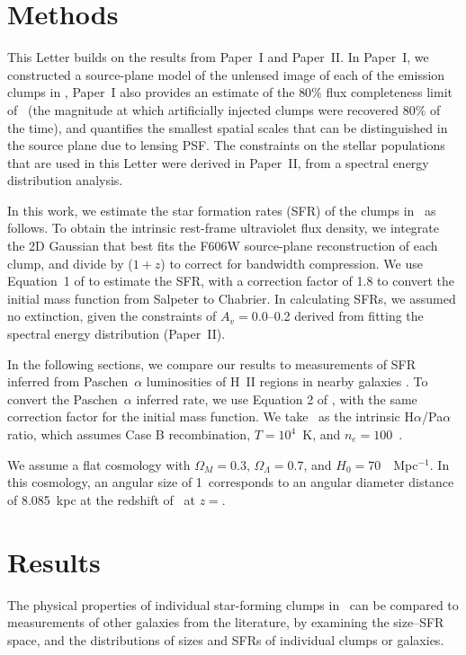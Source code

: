 \section{Methods}\label{sec:methods}
This Letter builds on the results from Paper~I and Paper~II.
In Paper~I, we constructed a source-plane model of the unlensed image
of each of the emission clumps in \arcname, 
Paper~I also provides an estimate of the  
$80\%$ flux completeness limit of 
\fluxcompleteness\ (the magnitude at which artificially injected clumps were recovered 
$80\%$ of the time), and quantifies the 
smallest spatial scales that can be distinguished in the source plane
due to lensing PSF.
The constraints on the stellar populations that are used in this
Letter were derived in Paper~II,
from a spectral energy distribution analysis. 

In this work, we estimate the star formation rates (SFR) of the clumps in
\arcname\ as follows.  
To obtain the intrinsic rest-frame ultraviolet flux density, we integrate 
the 2D Gaussian that best fits the F606W source-plane reconstruction of each clump, 
and divide by ($1+z$) to correct for bandwidth compression.  
We use Equation~1 of \citet{Kennicutt:1998ki}
to estimate the SFR, 
with a correction factor of 1.8 to convert the initial mass function from Salpeter to Chabrier.
In calculating SFRs, we assumed no extinction, 
given the constraints of $A_v = 0.0$--0.2 derived from fitting the spectral 
energy distribution (Paper~II).

In the following sections, we compare our results to
measurements of SFR inferred from Paschen~$\alpha$ luminosities
of H~II regions in nearby galaxies \citep{Liu:2013fw}.
To convert the Paschen~$\alpha$ inferred rate, we use Equation 2 of
\citet{Kennicutt:1998ki}, with the same correction factor for the initial mass function.
We take \HaParatio\ as the intrinsic H$\alpha$/Pa$\alpha$ ratio, 
which assumes Case B recombination, $T=10^4$~K, and $n_e =100$~\cc .

We assume a flat cosmology with $\Omega_M = 0.3$, $\Omega_{\Lambda} = 0.7$, 
and $H_0 = 70$~\kms~Mpc$^{-1}$.
In this cosmology, an angular size of 1\arcsec\ 
corresponds to an angular diameter distance of 8.085~kpc at the 
redshift of \arcname\ at $z=$\zA . 

\section{Results}\label{sec:results}
The physical properties of individual star-forming clumps in
\arcname\ can be compared to measurements of other galaxies from the
literature, by examining the size--SFR space, and the
distributions of sizes and SFRs of individual clumps or galaxies. 


